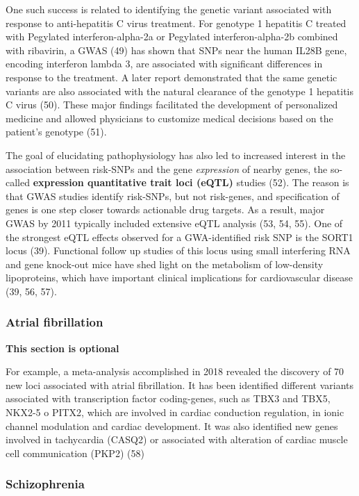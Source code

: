 \documentclass[
]{book}
\begin{document}
One such success is related to identifying the genetic variant associated with response to anti-hepatitis C virus treatment. For genotype 1 hepatitis C treated with Pegylated interferon-alpha-2a or Pegylated interferon-alpha-2b combined with ribavirin, a GWAS (49) has shown that SNPs near the human IL28B gene, encoding interferon lambda 3, are associated with significant differences in response to the treatment. A later report demonstrated that the same genetic variants are also associated with the natural clearance of the genotype 1 hepatitis C virus (50). These major findings facilitated the development of personalized medicine and allowed physicians to customize medical decisions based on the patient's genotype (51).

The goal of elucidating pathophysiology has also led to increased interest in the association between risk-SNPs and the gene \emph{expression} of nearby genes, the so-called \textbf{expression quantitative trait loci (eQTL)} studies (52). The reason is that GWAS studies identify risk-SNPs, but not risk-genes, and specification of genes is one step closer towards actionable drug targets. As a result, major GWAS by 2011 typically included extensive eQTL analysis (53, 54, 55). One of the strongest eQTL effects observed for a GWA-identified risk SNP is the SORT1 locus (39). Functional follow up studies of this locus using small interfering RNA and gene knock-out mice have shed light on the metabolism of low-density lipoproteins, which have important clinical implications for cardiovascular disease (39, 56, 57).

\hypertarget{atrial-fibrillation}{%
\subsubsection{Atrial fibrillation}\label{atrial-fibrillation}}

\textbf{This section is optional}

For example, a meta-analysis accomplished in 2018 revealed the discovery of 70 new loci associated with atrial fibrillation. It has been identified different variants associated with transcription factor coding-genes, such as TBX3 and TBX5, NKX2-5 o PITX2, which are involved in cardiac conduction regulation, in ionic channel modulation and cardiac development. It was also identified new genes involved in tachycardia (CASQ2) or associated with alteration of cardiac muscle cell communication (PKP2) (58)

\hypertarget{schizophrenia}{%
\subsubsection{Schizophrenia}\label{schizophrenia}}
\end{document}
